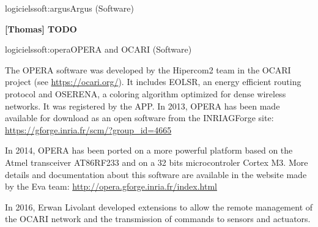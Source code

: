 \documentclass{ra2016}
\newcommand{\pascale}          {\textbf{Pascale~Minet}}
\newcommand{\commentthomas}[1] {\textbf{[Thomas] #1}}
\begin{document}
\begin{module}{logiciels}{soft:argus}{Argus (Software)}

\commentthomas{TODO}

\end{module}

\begin{module}{logiciels}{soft:opera}{OPERA and OCARI (Software)} 

\begin{participants}
\end{participants}

The OPERA software was developed by the Hipercom2 team in the OCARI project (see \url{https://ocari.org/}). It includes EOLSR, an  energy efficient routing protocol and OSERENA, a coloring algorithm optimized for dense wireless networks. It was registered by the APP.
In 2013, OPERA has been made available for download as an open software from the INRIAGForge site: \url{https://gforge.inria.fr/scm/?group_id=4665}

In 2014, OPERA has been ported on a more powerful platform based on the Atmel transceiver AT86RF233 and on a 32 bits microcontroler Cortex M3.
More details and documentation about this software are available in the website made by the Eva team:
\url{http://opera.gforge.inria.fr/index.html}

In 2016, Erwan Livolant developed extensions to allow the remote management of the OCARI 
network and the transmission of commands to sensors and actuators. 


\end{module}
\end{document}
